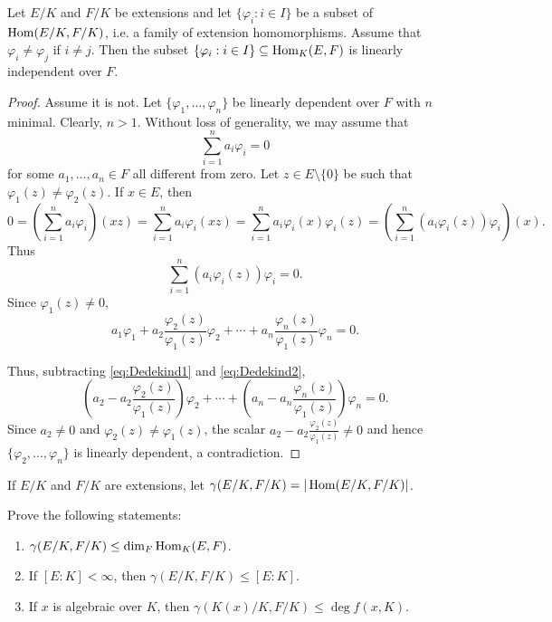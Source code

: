 \begin{theorem}[Dedekind]
Let $E/K$ and $F/K$ be extensions and let 
$\{\varphi_i:i\in I\}$ 
be a subset of
$\operatorname{Hom}(E/K,F/K)$, i.e. a 
family of extension homomorphisms. Assume that 
$\varphi_i\ne \varphi_j$ if $i\ne j$. Then 
the subset $\{\varphi_i:i\in I\}\subseteq\operatorname{Hom}_K(E,F)$ 
is linearly independent over $F$. 
\end{theorem}

\begin{proof}
    Assume it is not. Let $\{\varphi_1,\dots,\varphi_n\}$ 
    be linearly dependent over $F$ with $n$ minimal. Clearly, $n>1$. 
    Without loss of generality, we may assume that 
    \begin{equation}
        \label{eq:Dedekind1}
        \sum_{i=1}^n a_i\varphi_i=0
    \end{equation}
    for some $a_1,\dots,a_n\in F$ all different from zero. 
    Let
    $z\in E\setminus\{0\}$ be such that $\varphi_1(z)\ne\varphi_2(z)$. If $x\in E$, then
    \[
    0=\left(\sum_{i=1}^na_i\varphi_i\right)(xz)=\sum_{i=1}^na_i\varphi_i(xz)
    =\sum_{i=1}^na_i\varphi_i(x)\varphi_i(z)
    =\left(\sum_{i=1}^n (a_i\varphi_i(z))\varphi_i\right)(x).
    \]
    Thus 
    \[
        \sum_{i=1}^n (a_i\varphi_i(z))\varphi_i=0.
    \]
    Since $\varphi_1(z)\ne0$, 
    \begin{equation}
    \label{eq:Dedekind2}
        a_1\varphi_1+a_2\frac{\varphi_2(z)}{\varphi_1(z)}\varphi_2+\cdots+a_n\frac{\varphi_n(z)}{\varphi_1(z)}\varphi_n=0.
    \end{equation}

    Thus, 
    subtracting \eqref{eq:Dedekind1} and \eqref{eq:Dedekind2}, 
    \[
    \left(a_2-a_2\frac{\varphi_2(z)}{\varphi_1(z)}\right)\varphi_2
    +\cdots+\left(a_n-a_n\frac{\varphi_n(z)}{\varphi_1(z)}\right)\varphi_n=0.
    \]
    Since $a_2\ne 0$ and $\varphi_2(z)\ne\varphi_1(z)$, 
    the scalar $a_2-a_2\frac{\varphi_2(z)}{\varphi_1(z)}\ne 0$ and hence 
    $\{\varphi_2,\dots,\varphi_n\}$ is linearly dependent, a contradiction. 
\end{proof}

If $E/K$ and $F/K$ are extensions, 
let $\gamma(E/K,F/K)=|\operatorname{Hom}(E/K,F/K)|$. 

\begin{exercise}
Prove the following statements:
\begin{enumerate}
    \item $\gamma(E/K,F/K)\leq\dim_F\operatorname{Hom}_K(E,F)$.
    \item If $[E:K]<\infty$, then $\gamma(E/K,F/K)\leq[E:K]$. 
    \item If $x$ is algebraic over $K$, then $\gamma(K(x)/K,F/K)\leq\deg f(x,K)$.
\end{enumerate}
\end{exercise}

